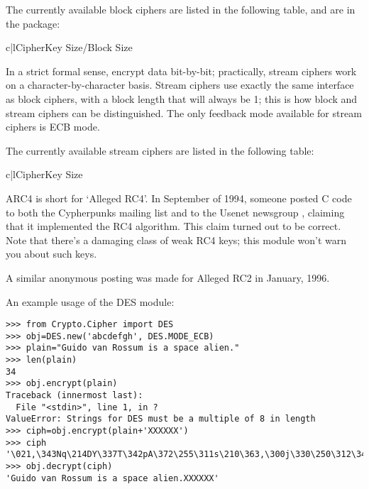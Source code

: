 \documentclass{howto}
\begin{document}
The currently available block ciphers are listed in the following table,
and are in the  package:

\begin{tableii}{c|l}{}{Cipher}{Key Size/Block Size}
\end{tableii}

In a strict formal sense,  encrypt data bit-by-bit;
practically, stream ciphers work on a character-by-character basis.
Stream ciphers use exactly the
same interface as block ciphers, with a block length that will always
be 1; this is how block and stream ciphers can be distinguished. 
The only feedback mode available for stream ciphers is ECB mode. 

The currently available stream ciphers are listed in the following table:

\begin{tableii}{c|l}{}{Cipher}{Key Size}
\end{tableii}

ARC4 is short for `Alleged RC4'.  In September of 1994, someone posted
C code to both the Cypherpunks mailing list and to the Usenet
newsgroup , claiming that it implemented the RC4
algorithm.  This claim turned out to be correct.  Note that there's a
damaging class of weak RC4 keys; this module won't warn you about such keys.

A similar anonymous posting was made for Alleged RC2 in January, 1996.

An example usage of the DES module:
\begin{verbatim}
>>> from Crypto.Cipher import DES
>>> obj=DES.new('abcdefgh', DES.MODE_ECB)
>>> plain="Guido van Rossum is a space alien."
>>> len(plain)
34
>>> obj.encrypt(plain)
Traceback (innermost last):
  File "<stdin>", line 1, in ?
ValueError: Strings for DES must be a multiple of 8 in length
>>> ciph=obj.encrypt(plain+'XXXXXX')
>>> ciph
'\021,\343Nq\214DY\337T\342pA\372\255\311s\210\363,\300j\330\250\312\347\342I\3215w\03561\303dgb/\006'
>>> obj.decrypt(ciph)
'Guido van Rossum is a space alien.XXXXXX'
\end{verbatim}
\end{document}
